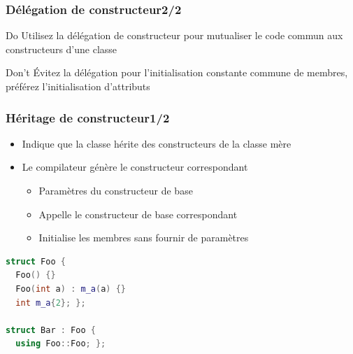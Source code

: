 \documentclass[C++.tex]{subfiles}
\begin{document}
\begin{frame}[fragile]
	\frametitle{Délégation de constructeur\titlehfill{}2/2}
	\begin{exampleblock}{Do}
		Utilisez la délégation de constructeur pour mutualiser le code commun aux constructeurs d'une classe

	\end{exampleblock}

	\begin{alertblock}{Don't}
		Évitez la délégation pour l'initialisation constante commune de membres, préférez l'initialisation d'attributs
	\end{alertblock}
\end{frame}

\begin{frame}[fragile]
	\frametitle{Héritage de constructeur\titlehfill{}1/2}
	\begin{itemize}
		\item Indique que la classe hérite des constructeurs de la classe mère
		\item Le compilateur génère le constructeur correspondant
		\begin{itemize}
			\item Paramètres du constructeur de base
			\item Appelle le constructeur de base correspondant
			\item Initialise les membres sans fournir de paramètres

		\end{itemize}
	\end{itemize}

	\begin{lstlisting}[language=C++]
struct Foo {
  Foo() {}
  Foo(int a) : m_a(a) {}
  int m_a{2}; };

struct Bar : Foo {
  using Foo::Foo; };\end{lstlisting}
\end{frame}
\end{document}
